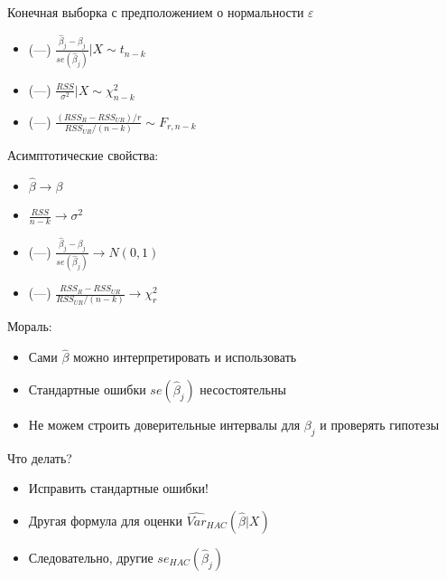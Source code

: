 \documentclass[ignorenonframetext,]{beamer}
\begin{document}
\begin{frame}{Конечная выборка с предположением о нормальности
$\varepsilon$}

\begin{itemize}
\item
  (---)
  $\frac{\hat{\beta}_j-\beta_j}{se(\hat{\beta}_j)} | X \sim t_{n-k}$
\item
  (---) $\frac{RSS}{\sigma^2} |X \sim \chi^2_{n-k}$
\item
  (---) $\frac{(RSS_R-RSS_{UR})/r}{RSS_{UR}/(n-k)} \sim F_{r,n-k}$
\end{itemize}

\end{frame}

\begin{frame}{Асимптотические свойства:}

\begin{itemize}
\item
  $\hat{\beta} \to \beta$
\item
  $\frac{RSS}{n-k} \to \sigma^2$
\item
  (---) $\frac{\hat{\beta}_j-\beta_j}{se(\hat{\beta}_j)} \to N(0,1)$
\item
  (---) $\frac{RSS_R-RSS_{UR}}{RSS_{UR}/(n-k)} \to \chi^2_r$
\end{itemize}

\end{frame}

\begin{frame}{Мораль:}

\begin{itemize}
\item
  Сами $\hat{\beta}$ можно интерпретировать и использовать
\item
  Стандартные ошибки $se(\hat{\beta}_j)$ несостоятельны
\item
  Не можем строить доверительные интервалы для $\beta_j$ и проверять
  гипотезы
\end{itemize}

\end{frame}

\begin{frame}{Что делать?}

\begin{itemize}
\item
  Исправить стандартные ошибки!
\item
  Другая формула для оценки $\widehat{Var}_{HAC}(\hat{\beta}|X)$
\item
  Следовательно, другие $se_{HAC}(\hat{\beta}_j)$
\end{itemize}

\end{frame}
\end{document}
